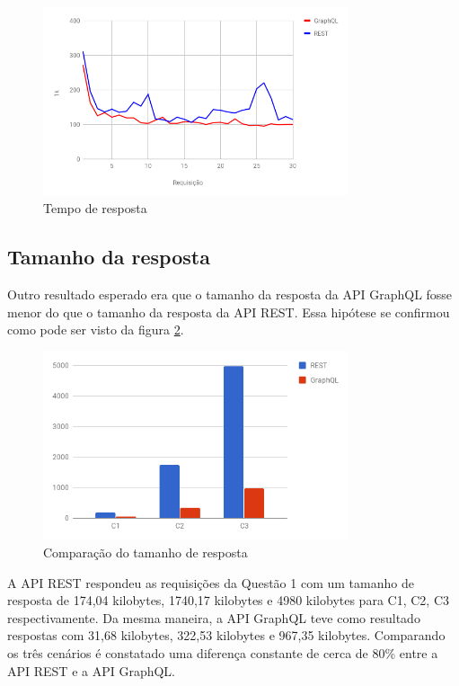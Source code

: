 \begin{figure}[htbp]
    \centering
    \includegraphics[width=0.8\textwidth]{figuras/q1-time-line.png}
    \caption{Tempo de resposta}
    \label{fig:q1-time-line}
\end{figure}

\subsection{Tamanho da resposta}

Outro resultado esperado era que o tamanho da resposta da API GraphQL fosse menor do que o tamanho da resposta da API REST. Essa hipótese se confirmou como pode ser visto da figura \ref{fig:q1-size}.

\begin{figure}[htbp]
    \centering
    \includegraphics[width=0.8\textwidth]{figuras/q1-size.png}
    \caption{Comparação do tamanho de resposta}
    \label{fig:q1-size}
    \author{fonte: Autor}
\end{figure}

A API REST respondeu as requisições da Questão 1 com um tamanho de resposta de 174,04 kilobytes, 1740,17 kilobytes e 4980 kilobytes para C1, C2, C3 respectivamente. Da mesma maneira, a API GraphQL teve como resultado respostas com 31,68 kilobytes, 322,53 kilobytes e 967,35 kilobytes. Comparando os três cenários é constatado uma diferença constante de cerca de 80\% entre a API REST e a API GraphQL.

